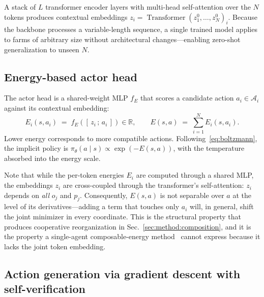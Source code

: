 \documentclass{article}
\begin{document}
A stack of $L$ transformer encoder layers with multi-head self-attention over the $N$ tokens produces contextual embeddings $z_i = \operatorname{Transformer}(z_1^0, \ldots, z_N^0)_i$. Because the backbone processes a variable-length sequence, a single trained model applies to farms of arbitrary size without architectural changes---enabling zero-shot generalization to unseen $N$.

\subsection{Energy-based actor head}
\label{sec:method:energy}

The actor head is a shared-weight MLP $f_E$ that scores a candidate action $a_i \in \mathcal{A}_i$ against its contextual embedding:
\begin{equation}
E_i(s, a_i) \;=\; f_E\!\left([\,z_i\,;\,a_i\,]\right) \in \mathbb{R},
\qquad
E(s, a) \;=\; \sum_{i=1}^{N} E_i(s, a_i).
\label{eq:energy}
\end{equation}
Lower energy corresponds to more compatible actions. Following~\eqref{eq:boltzmann}, the implicit policy is $\pi_\theta(a \mid s) \propto \exp\!\left(-E(s, a)\right)$, with the temperature absorbed into the energy scale.

Note that while the per-token energies $E_i$ are computed through a shared MLP, the embeddings $z_i$ are cross-coupled through the transformer's self-attention: $z_i$ depends on \emph{all} $o_j$ and $p_j$. Consequently, $E(s, a)$ is not separable over $a$ at the level of its derivatives---adding a term that touches only $a_i$ will, in general, shift the joint minimizer in every coordinate. This is the structural property that produces cooperative reorganization in Sec.~\ref{sec:method:composition}, and it is the property a single-agent composable-energy method~\citep{cep_urain2023, ebt_policy2025} cannot express because it lacks the joint token embedding.

\subsection{Action generation via gradient descent with self-verification}
\label{sec:method:inference}
\end{document}
